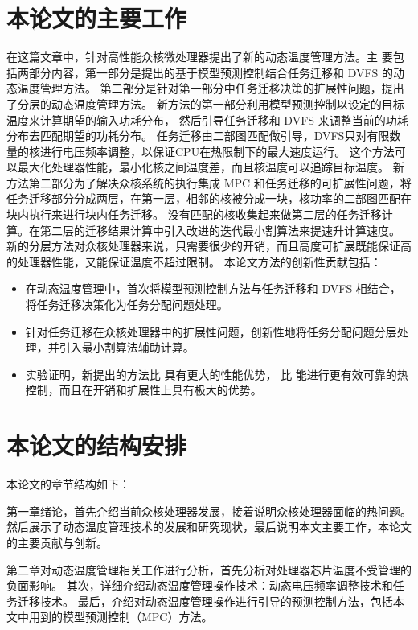  \section{本论文的主要工作}\label{sec:thispaper}
在这篇文章中，针对高性能众核微处理器提出了新的动态温度管理方法。主
要包括两部分内容，第一部分是提出的基于模型预测控制结合任务迁移和 DVFS 的动态温度管理方法。
第二部分是针对第一部分中任务迁移决策的扩展性问题，提出了分层的动态温度管理方法。
新方法的第一部分利用模型预测控制以设定的目标温度来计算期望的输入功耗分布，
然后引导任务迁移和 DVFS 来调整当前的功耗分布去匹配期望的功耗分布。
任务迁移由二部图匹配做引导，DVFS只对有限数量的核进行电压频率调整，以保证CPU在热限制下的最大速度运行。
这个方法可以最大化处理器性能，最小化核之间温度差，而且核温度可以追踪目标温度。
新方法第二部分为了解决众核系统的执行集成 MPC 和任务迁移的可扩展性问题，将任务迁移部分分成两层，在第一层，相邻的核被分成一块，核功率的二部图匹配在块内执行来进行块内任务迁移。
没有匹配的核收集起来做第二层的任务迁移计算。在第二层的迁移结果计算中引入改进的迭代最小割算法来提速升计算速度。
新的分层方法对众核处理器来说，只需要很少的开销，而且高度可扩展既能保证高的处理器性能，又能保证温度不超过限制。
本论文方法的创新性贡献包括：
\begin{itemize}
\item 在动态温度管理中，首次将模型预测控制方法与任务迁移和 DVFS 相结合，将任务迁移决策化为任务分配问题处理。
\item 针对任务迁移在众核处理器中的扩展性问题，创新性地将任务分配问题分层处理，并引入最小割算法辅助计算。
\item 实验证明，新提出的方法比 \cite{Zanini:ECCTD'09} 具有更大的性能优势，
      比 \cite{Hanumaiah:TCAD'11} 能进行更有效可靠的热控制，而且在开销和扩展性上具有极大的优势。
\end{itemize}

 \section{本论文的结构安排}\label{sec:sec}
本论文的章节结构如下：

第一章绪论，首先介绍当前众核处理器发展，接着说明众核处理器面临的热问题。
然后展示了动态温度管理技术的发展和研究现状，最后说明本文主要工作，本论文的主要贡献与创新。

第二章对动态温度管理相关工作进行分析，首先分析对处理器芯片温度不受管理的负面影响。
其次，详细介绍动态温度管理操作技术：动态电压频率调整技术和任务迁移技术。
最后，介绍对动态温度管理操作进行引导的预测控制方法，包括本文中用到的模型预测控制（MPC）方法。

